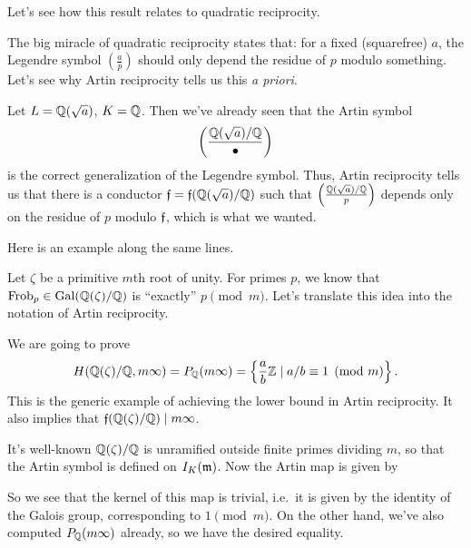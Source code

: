 Let's see how this result relates to quadratic reciprocity.
\begin{example}
	The big miracle of quadratic reciprocity states that:
	for a fixed (squarefree) $a$,
	the Legendre symbol $\left( \frac ap \right)$
	should only depend the residue of $p$ modulo something.
	Let's see why Artin reciprocity tells us this \emph{a priori}.

	Let $L = \mathbb Q(\sqrt a)$, $K = \mathbb Q$.
	Then we've already seen that the Artin symbol
	\[ \left( \frac{\mathbb Q(\sqrt a)/\mathbb Q}{\bullet} \right) \]
	is the correct generalization of the Legendre symbol.
	Thus, Artin reciprocity tells us that there is a conductor
	$\mathfrak f = \mathfrak f(\mathbb Q(\sqrt a)/\mathbb Q)$ such that
	$\left( \frac{\mathbb Q(\sqrt a)/\mathbb Q}{p} \right)$ depends only on 
	the residue of $p$ modulo $\mathfrak f$, which is what we wanted.
\end{example}

Here is an example along the same lines.
\begin{example}
	Let $\zeta$ be a primitive $m$th root of unity.
	For primes $p$, we know that $\mathrm{Frob}_p \in \operatorname{Gal}(\mathbb Q(\zeta)/\mathbb Q)$
	is ``exactly'' $p \pmod m$.
	Let's translate this idea into the notation of Artin reciprocity.

	We are going to prove
	\[ 
		H(\mathbb Q(\zeta) / \mathbb Q,  m\infty)
		= P_\mathbb Q(m\infty)
		= \left\{ \frac ab \mathbb Z \mid a/b \equiv 1 \pmod m \right\}.
	\]
	This is the generic example of achieving the lower bound in Artin reciprocity.
	It also implies that $\mathfrak f(\mathbb Q(\zeta)/\mathbb Q) \mid m\infty$.

	It's well-known $\mathbb Q(\zeta)/\mathbb Q$ is unramified outside finite primes dividing $m$,
	so that the Artin symbol is defined on $I_K(\mathfrak m)$.
	Now the Artin map is given by
	\begin{center}
	\end{center}
	So we see that the kernel of this map is trivial,
	i.e.\ it is given by the identity of the Galois group,
	corresponding to $1 \pmod m$.
	On the other hand, we've also computed $P_\mathbb Q(m\infty)$ already,
	so we have the desired equality.
\end{example}

